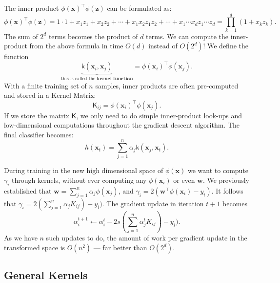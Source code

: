 \documentclass[12pt]{article}
\begin{document}
 
 The inner product $\phi(\mathbf{x})^\top \phi(\mathbf{z})$ can be formulated as: 
 \begin{equation}
 \phi(\mathbf{x})^\top \phi(\mathbf{z})=1\cdot 1+x_1z_1+x_2z_2+\cdots +x_1x_2z_1z_2+ \cdots +x_1\cdots x_dz_1\cdots z_d=\prod_{k=1}^d(1+x_kz_k)\text{.}\label{eq:c15:poly}
 \end{equation}
 The sum of $2^d$ terms becomes the product of $d$ terms. We can compute the inner-product from the above formula in time $O(d)$ instead of $O(2^d)$! 
 We define the function 
 \begin{equation}
 \underbrace{\mathsf{k}(\mathbf{x}_i,\mathbf{x}_j)}_{\text{this is called the} \textbf{ kernel function}}=\phi(\mathbf{x}_i)^\top \phi(\mathbf{x}_j).
 \end{equation}
 With a finite training set of $n$ samples, inner products are often pre-computed and stored in a Kernel Matrix:
 \begin{equation}
 \mathsf{K}_{ij}=\phi(\mathbf{x}_i)^\top \phi(\mathbf{x}_j).
 \end{equation}
 If we store the matrix $\mathsf{K}$, we only need to do simple inner-product look-ups and low-dimensional computations throughout the gradient descent algorithm. 
 The final classifier becomes:
 \begin{equation}
 h(\mathbf{x}_t)=\sum_{j=1}^n\alpha_j\mathsf{k}(\mathbf{x}_j,\mathbf{x}_t).
 \end{equation}
 
 During training in the new high dimensional space of $\phi(\mathbf{x})$ we want to compute $\gamma_i$ through kernels, without ever computing any $\phi(\mathbf{x}_i)$ or even $\mathbf{w}$. We previously established that $\mathbf{w}=\sum_{j=1}^n\alpha_j \phi(\mathbf{x}_j)$, and 
 $\gamma_i=2(\mathbf{w}^\top \phi(\mathbf{x}_i)-y_i)$. It follows that $\gamma_i=2(\sum_{j=1}^n \alpha_jK_{ij})-y_i)$. The gradient update in iteration $t+1$ becomes $$\alpha_i^{t+1}\leftarrow \alpha_i^t-2s(\sum_{j=1}^n \alpha_j^tK_{ij})-y_i).$$
 As we have $n$ such updates to do, the amount of work per gradient update in the transformed space is $O(n^2)$ --- far better than $O(2^d)$. 
 
 
 \subsection{General Kernels}
 
\end{document}
